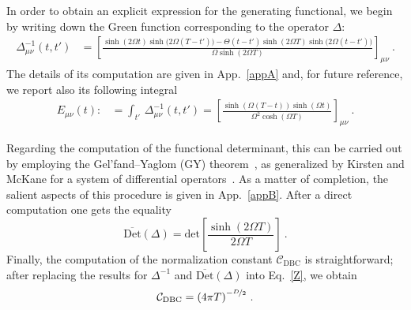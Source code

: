 \documentclass[12pt,a4paper]{article}
\numberwithin{equation}{section}
\numberwithin{equation}{section}
\begin{document}
In order to obtain an explicit expression for the generating functional, we begin by writing down the Green function corresponding to the operator $\Delta$:
\begin{align}\label{sGF}
\Delta^{-1}_{\mu\nu}(t,t')
&=\left[\frac{ \sinh(2\Omega t) \sinh\big(2\Omega (T-t')\big) - \Theta(t-t') \sinh(2\Omega T) \sinh\big(2\Omega (t-t')\big) }{\Omega \sinh(2\Omega T)}\right]_{\mu\nu}\ .
\end{align}
The details of its computation are given in App.~\ref{appA} and, for future reference, we report also its following integral
\begin{align}
E_{\mu\nu}(t):&=\int_{t'} \, \Delta^{-1}_{\mu\nu}(t,t') =\left[\frac{\sinh\left(\Omega (T-t)\right)\sinh\left(\Omega t\right)}{\Omega^2\cosh\left(\Omega T\right)} \right]_{\mu\nu}\ . \label{int1} 
\end{align}

Regarding the computation of the functional determinant, this can be carried out by employing the Gel’fand–Yaglom (GY) theorem~\cite{Gelfand:1959nq}, as generalized by Kirsten and McKane for a system of differential operators~\cite{Kirsten:2003py, Kirsten:2004qv}. 
As a matter of completion, the salient aspects of this procedure is given in App.~\ref{appB}. After a direct computation one gets the equality
\begin{equation} \label{DetS}
{\overline{\mathrm{Det}}(\Delta)=\mathrm{det}\left[ \frac{\sinh(2\Omega T)}{2\Omega T} \right]}\ .
\end{equation}
Finally, the computation of the normalization constant $\mathcal{C}_{\mathrm{DBC}}$ is straightforward; after replacing the results for $\Delta^{-1}$ and $\overline{\mathrm{Det}}(\Delta)$ into Eq.~\eqref{Z}, we obtain
\begin{equation} \label{Cs}
{\mathcal{C}_{\mathrm{DBC}} =\left( 4\pi T \right)^{-\nicefrac{D}{2}}}\ .
\end{equation}


\end{document}
